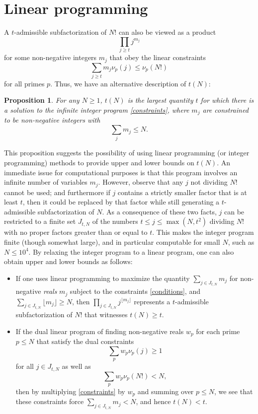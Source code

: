 \documentclass[12pt,a4paper,reqno]{amsart}
\numberwithin{equation}{section}
\theoremstyle{plain}
\newtheorem{proposition}[theorem]{Proposition}
\theoremstyle{definition}
\begin{document}
\section{Linear programming}\label{linprog-sec}

A $t$-admissible subfactorization of $N!$ can also be viewed as a product
$$ \prod_{j \geq t} j^{m_j}$$
for some non-negative integers $m_j$ that obey the linear constraints
\begin{equation}\label{constraints}
  \sum_{j \geq t} m_j \nu_p(j) \leq \nu_p(N!)
\end{equation}
for all primes $p$.  Thus, we have an alternative description of $t(N)$:

\begin{proposition}  For any $N \geq 1$, $t(N)$ is the largest quantity $t$ for which there is a solution to the infinite integer program \eqref{constraints}, where $m_j$ are constrained to be non-negative integers with
$$ \sum_j m_j \leq N.$$
\end{proposition}

This proposition suggests the possibility of using linear programming (or integer programming) methods to provide upper and lower bounds on $t(N)$. An immediate issue for computational purposes is that this program involves an infinite number of variables $m_j$.  However, observe that any $j$ not dividing $N!$ cannot be used; and furthermore if $j$ contains a strictly smaller factor that is at least $t$, then it could be replaced by that factor while still generating a $t$-admissible subfactorization of $N$.  As a consequence of these two facts, $j$ can be restricted to a finite set $J_{t,N}$ of the numbers $t \leq j \leq \max(N,t^2)$ dividing $N!$ with no proper factors greater than or equal to $t$.  This makes the integer program finite (though somewhat large), and in particular computable for small $N$, such as $N \leq 10^4$.  By relaxing the integer program to a linear program, one can also obtain upper and lower bounds as follows:

\begin{itemize}
  \item If one uses linear programming to maximize the quantity $\sum_{j \in J_{t,N}} m_j$ for non-negative \emph{reals} $m_j$ subject to the constraints \eqref{conditions}, and $\sum_{j \in J_{t,N}} \lfloor m_j \rfloor \geq N$, then $\prod_{j \in J_{t,N}} j^{\lfloor m_j \rfloor}$ represents a $t$-admissible subfactorization of $N!$ that witnesses $t(N) \geq t$.
  \item If the dual linear program of finding non-negative reals $w_p$ for each prime $p \leq N$ that satisfy the dual constraints
  \begin{equation}\label{pj}
    \sum_p w_p \nu_p(j) \geq 1
   \end{equation}
   for all $j \in J_{t,N}$ as well as
   \begin{equation}\label{hyp}
    \sum_p w_p \nu_p(N!) < N,
    \end{equation}
    then by multiplying \eqref{constraints} by $w_p$ and summing over $p \leq N$, we see that these constraints force $\sum_{j \in J_{t,N}} m_j < N$, and hence $t(N) < t$.
\end{itemize}
\end{document}
